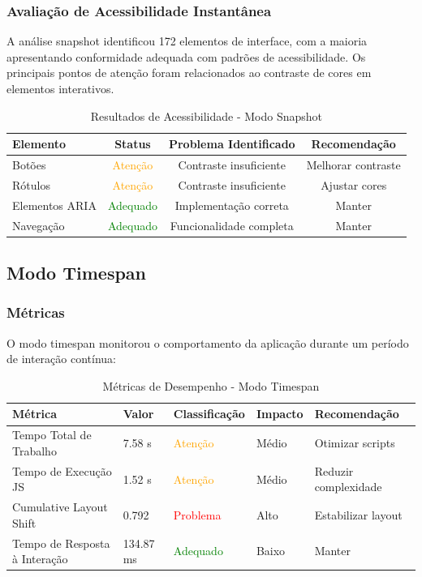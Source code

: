 \subsubsection{Avaliação de Acessibilidade Instantânea}

A análise snapshot identificou 172 elementos de interface, com a maioria apresentando conformidade adequada com padrões de acessibilidade. Os principais pontos de atenção foram relacionados ao contraste de cores em elementos interativos.

\begin{table}[h]
\centering
\caption{Resultados de Acessibilidade - Modo Snapshot}
\begin{tabular}{|l|c|c|c|}
\hline
\textbf{Elemento} & \textbf{Status} & \textbf{Problema Identificado} & \textbf{Recomendação} \\
\hline
Botões & \textcolor{orange}{Atenção} & Contraste insuficiente & Melhorar contraste \\
\hline
Rótulos & \textcolor{orange}{Atenção} & Contraste insuficiente & Ajustar cores \\
\hline
Elementos ARIA & \textcolor{green}{Adequado} & Implementação correta & Manter \\
\hline
Navegação & \textcolor{green}{Adequado} & Funcionalidade completa & Manter \\
\hline
\end{tabular}
\end{table}

\subsection{Modo Timespan}

\subsubsection{Métricas}

O modo timespan monitorou o comportamento da aplicação durante um período de interação contínua:

\begin{table}[h]
\centering
\tiny
\caption{Métricas de Desempenho - Modo Timespan}
\begin{tabular}{|m{2.5cm}|m{2cm}|m{2cm}|m{2cm}|m{3cm}|}
\hline
\textbf{Métrica} & \textbf{Valor} & \textbf{Classificação} & \textbf{Impacto} & \textbf{Recomendação} \\
\hline
Tempo Total de Trabalho & 7.58 s & \textcolor{orange}{Atenção} & Médio & Otimizar scripts \\
\hline
Tempo de Execução JS & 1.52 s & \textcolor{orange}{Atenção} & Médio & Reduzir complexidade \\
\hline
Cumulative Layout Shift & 0.792 & \textcolor{red}{Problema} & Alto & Estabilizar layout \\
\hline
Tempo de Resposta à Interação & 134.87 ms & \textcolor{green}{Adequado} & Baixo & Manter \\
\hline
\end{tabular}
\end{table}

